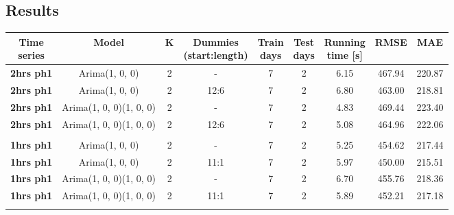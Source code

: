 \documentclass[12pt,a4paper,titlepage]{report}
\begin{document}
\newpage



\begin{appendices}
    \chapter{Results}\label{resultsappendix}

\begin{table}[h]
    \begin{tabular}{|c|c|c|c|c|c|c|c|c|}
        \hline
        \makecell{\textbf{Time} \\ \textbf{series}} & \textbf{Model}          & \textbf{K} & \makecell{\textbf{Dummies} \\ \textbf{(start:length)}} & \makecell{\textbf{Train} \\ \textbf{days}} & \makecell{\textbf{Test}\\ \textbf{days}} & \makecell{\textbf{Running} \\ \textbf{time {[}s{]}}} & \textbf{RMSE} & \textbf{MAE} \\ \hline
        \textbf{2hrs ph1} & Arima(1, 0, 0)          & 2 & -    & 7 & 2 & 6.15     & 467.94 & 220.87 \\ \hline
        \textbf{2hrs ph1} & Arima(1, 0, 0)          & 2 & 12:6  & 7 & 2 & 6.80     & 463.00 & 218.81 \\ \hline
        \textbf{2hrs ph1} & Arima(1, 0, 0)(1, 0, 0) & 2 & -    & 7 & 2 & 4.83     & 469.44 & 223.40 \\ \hline
        \textbf{2hrs ph1} & Arima(1, 0, 0)(1, 0, 0) & 2 & 12:6  & 7 & 2 & 5.08     & 464.96 & 222.06 \\ \hline
        \textbf{}         &                         &   &      &   &   &          &        &        \\ \hline
        \textbf{1hrs ph1} & Arima(1, 0, 0)          & 2 & -    & 7 & 2 & 5.25     & 454.62 & 217.44 \\ \hline
        \textbf{1hrs ph1} & Arima(1, 0, 0)          & 2 & 11:1 & 7 & 2 & 5.97     & 450.00 & 215.51 \\ \hline
        \textbf{1hrs ph1} & Arima(1, 0, 0)(1, 0, 0) & 2 & -    & 7 & 2 & 6.70     & 455.76 & 218.36 \\ \hline
        \textbf{1hrs ph1} & Arima(1, 0, 0)(1, 0, 0) & 2 & 11:1 & 7 & 2 & 5.89     & 452.21 & 217.18 \\ \hline
        \textbf{}         &                         &   &      &   &   &          &        &        \\ \hline

\end{tabular}
\end{table}
\end{appendices}
\end{document}
